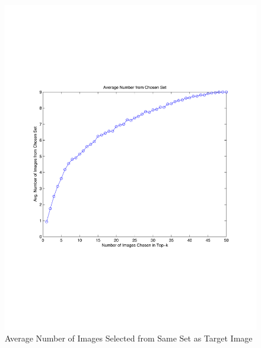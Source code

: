 \begin{figure} 
\begin{centering}
    \includegraphics[scale=0.35]{figures/50_image_sets/avgNumMatching_50_images.pdf}
    \caption{Average Number of Images Selected from Same Set as Target Image}
    \label{fig:topkAvgNumSameSet}
\end{centering}
\end{figure}


